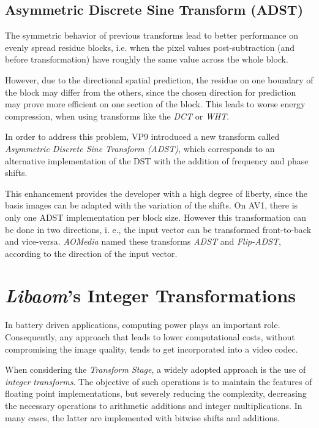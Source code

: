\subsection{Asymmetric Discrete Sine Transform (ADST)}

\nocite{hanButterflyStructuredDesign2013}
\nocite{bingNextgenerationVideoCoding2015}

The symmetric behavior of previous transforms lead to better performance on evenly spread residue blocks, i.e. when the pixel values post-subtraction (and before transformation) have roughly the same value across the whole block.

However, due to the directional spatial prediction, the residue on one boundary of the block may differ from the others, since the chosen direction for prediction may prove more efficient on one section of the block. This leads to worse energy compression, when using transforms like the \emph{DCT} or \emph{WHT}.

In order to address this problem, VP9 introduced a new transform called \emph{Asymmetric Discrete Sine Transform (ADST)}, which corresponds to an alternative implementation of the DST with the addition of frequency and phase shifts.

This enhancement provides the developer with a high degree of liberty, since the basis images can be adapted with the variation of the shifts. On AV1, there is only one ADST implementation per block size. However this transformation can be done in two directions, i. e., the input vector can be transformed front-to-back and vice-versa. \emph{AOMedia} named these transforms \emph{ADST} and \emph{Flip-ADST}, according to the direction of the input vector.


\section{\emph{Libaom}'s Integer Transformations}
\nocite{soo-changpeiIntegerTransformsAnalogous2000}

In battery driven applications, computing power plays an important role. Consequently, any approach that leads to lower computational costs, without compromising the image quality, tends to get incorporated into a video codec.

When considering the \emph{Transform Stage}, a widely adopted approach is the use of \emph{integer transforms}. The objective of such operations is to maintain the features of floating point implementations, but severely reducing the complexity, decreasing the necessary operations to arithmetic additions and integer multiplications. In many cases, the latter are implemented with bitwise shifts and additions.

